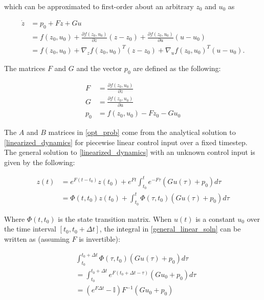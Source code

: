 \documentclass{exam}
\begin{document}
\begin{multicols*}{2}
which can be approximated to first-order about an arbitrary $z_0$ and $u_0$ as

\begin{equation}
    \label{linearized_dynamics}
    \begin{aligned}
        \dot{z} &= p_0 + F z + G u \\
        &= f(z_0, u_0) + \frac{\partial f(z_0, u_0)}{\partial z} (z - z_0) + \frac{\partial f(z_0, u_0)}{\partial u} (u - u_0) \\
        &= f(z_0, u_0) + \nabla_z f(z_0, u_0)^T (z - z_0) + \nabla_u f(z_0, u_0)^T (u - u_0) .
    \end{aligned}
\end{equation}

The matrices $F$ and $G$ and the vector $p_0$ are defined as the following:

\begin{equation}
    \label{eq:lin-dyn-labeled-derivs-whatevs}
    \begin{aligned}
        F &= \frac{\partial f(z_0, u_0)}{\partial z} \\
        G &= \frac{\partial f(z_0, u_0)}{\partial u} \\
        p_0 &= f(z_0, u_0) - F z_0 - G u_0
    \end{aligned}
\end{equation}

The $A$ and $B$ matrices in \eqref{opt_prob} come from the analytical solution to \eqref{linearized_dynamics} for piecewise linear control input over a fixed timestep. The general solution to \eqref{linearized_dynamics} with an unknown control input is given by the following:

\begin{equation}
    \label{general_linear_soln}
    \begin{aligned}
        z(t) &= e^{F(t - t_0)}z(t_0) + e^{Ft}\int_{t_0}^t e^{-F\tau} (G u(\tau) + p_0) d\tau \\
        &= \Phi(t, t_0)z(t_0) + \int_{t_0}^t \Phi(\tau, t_0) (G u(\tau) + p_0) d\tau
    \end{aligned}
\end{equation}

Where $\Phi(t, t_0)$ is the state transition matrix. When $u(t)$ is a constant $u_0$ over the time interval $[t_0, t_0 + \Delta t]$, the integral in \eqref{general_linear_soln} can be written as (assuming $F$ is invertible):

\begin{equation}
    \label{constant_input_integ_soln}
    \begin{split}
    &\int_{t_0}^{t_0 + \Delta t} \Phi(\tau, t_0) (G u(\tau) + p_0) d\tau\\
    &= \int_{t_0}^{t_0 + \Delta t} e^{F(t_0 + \Delta t -\tau)} (G u_0 + p_0) d\tau \\
    &= (e^{F \Delta t} - \mathbb{I})F^{-1}(G u_0 + p_0)
    \end{split}
\end{equation}


\end{multicols*}
\end{document}
